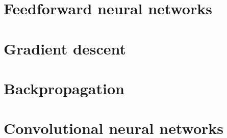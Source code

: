 \section{Feedforward neural networks}
\label{subsection:FNN}


\section{Gradient descent}
\label{subsection:gradient-descent}


\section{Backpropagation}
\label{subsection:backpropagation}


\section{Convolutional neural networks}
\label{subsection:convolutionalNN}

